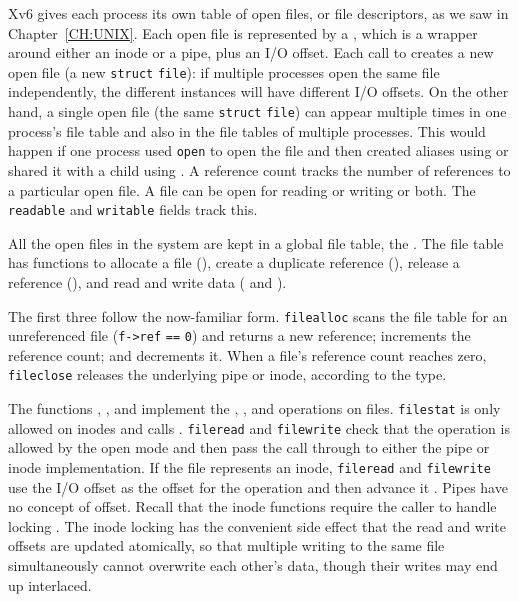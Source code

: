 Xv6 gives each process its own table of open files, or
file descriptors, as we saw in
Chapter~\ref{CH:UNIX}.
Each open file is represented by a
,
which is a wrapper around either an inode or a pipe,
plus an I/O offset.
Each call to 
creates a new open file (a new
\lstinline{struct}
\lstinline{file}):
if multiple processes open the same file independently,
the different instances will have different I/O offsets.
On the other hand, a single open file
(the same
\lstinline{struct}
\lstinline{file})
can appear
multiple times in one process's file table
and also in the file tables of multiple processes.
This would happen if one process used
\lstinline{open}
to open the file and then created aliases using
or shared it with a child using
.
A reference count tracks the number of references to
a particular open file.
A file can be open for reading or writing or both.
The
\lstinline{readable}
and
\lstinline{writable}
fields track this.

All the open files in the system are kept in a global file table,
the 
.
The file table
has functions to allocate a file
(),
create a duplicate reference
(),
release a reference
(),
and read and write data
(
and 
).

The first three follow the now-familiar form.
\lstinline{filealloc}
scans the file table for an unreferenced file
(\lstinline{f->ref}
\lstinline{==}
\lstinline{0})
and returns a new reference;
increments the reference count;
and
decrements it.
When a file's reference count reaches zero,
\lstinline{fileclose}
releases the underlying pipe or inode,
according to the type.

The functions
,
,
and
implement the 
,
,
and
operations on files.
\lstinline{filestat}
is only allowed on inodes and calls
.
\lstinline{fileread}
and
\lstinline{filewrite}
check that the operation is allowed by
the open mode and then
pass the call through to either
the pipe or inode implementation.
If the file represents an inode,
\lstinline{fileread}
and
\lstinline{filewrite}
use the I/O offset as the offset for the operation
and then advance it
.
Pipes have no concept of offset.
Recall that the inode functions require the caller
to handle locking
.
The inode locking has the convenient side effect that the
read and write offsets are updated atomically, so that
multiple writing to the same file simultaneously
cannot overwrite each other's data, though their writes may end up interlaced.
